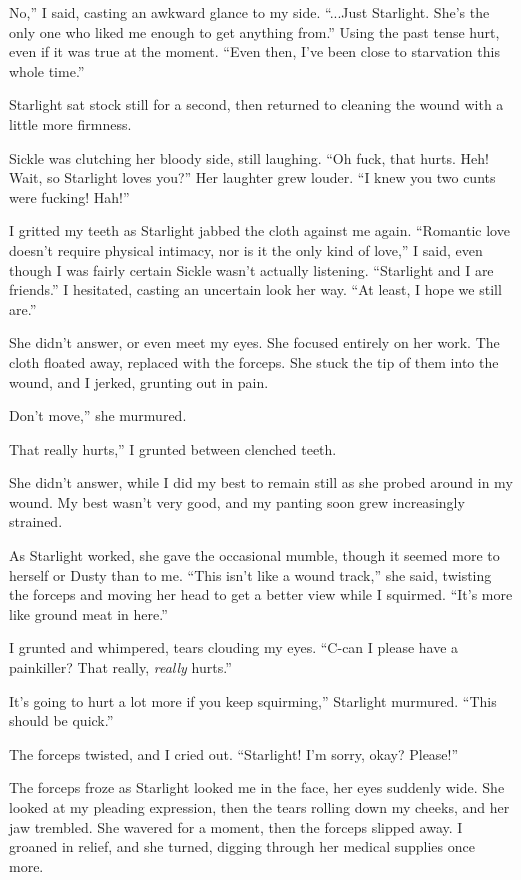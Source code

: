 \leavevmode{}No,” I said, casting an awkward glance to my side. “...Just Starlight. She’s the only one who liked me enough to get anything from.” Using the past tense hurt, even if it was true at the moment. “Even then, I’ve been close to starvation this whole time.”

Starlight sat stock still for a second, then returned to cleaning the wound with a little more firmness.

Sickle was clutching her bloody side, still laughing. “Oh fuck, that hurts. Heh! Wait, so Starlight loves you?” Her laughter grew louder. “I knew you two cunts were fucking! Hah!”

I gritted my teeth as Starlight jabbed the cloth against me again. “Romantic love doesn’t require physical intimacy, nor is it the only kind of love,” I said, even though I was fairly certain Sickle wasn’t actually listening. “Starlight and I are friends.” I hesitated, casting an uncertain look her way. “At least, I hope we still are.”

She didn’t answer, or even meet my eyes. She focused entirely on her work. The cloth floated away, replaced with the forceps. She stuck the tip of them into the wound, and I jerked, grunting out in pain.

\leavevmode{}Don’t move,” she murmured.

\leavevmode{}That really hurts,” I grunted between clenched teeth.

She didn’t answer, while I did my best to remain still as she probed around in my wound. My best wasn’t very good, and my panting soon grew increasingly strained.

As Starlight worked, she gave the occasional mumble, though it seemed more to herself or Dusty than to me. “This isn’t like a wound track,” she said, twisting the forceps and moving her head to get a better view while I squirmed. “It’s more like ground meat in here.”

I grunted and whimpered, tears clouding my eyes. “C-can I please have a painkiller? That really, \textit{really} hurts.”

\leavevmode{}It’s going to hurt a lot more if you keep squirming,” Starlight murmured. “This should be quick.”

The forceps twisted, and I cried out. “Starlight! I’m sorry, okay? Please!”

The forceps froze as Starlight looked me in the face, her eyes suddenly wide. She looked at my pleading expression, then the tears rolling down my cheeks, and her jaw trembled. She wavered for a moment, then the forceps slipped away. I groaned in relief, and she turned, digging through her medical supplies once more.

